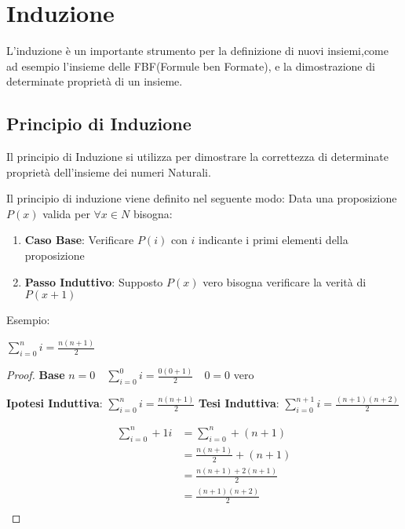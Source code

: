 \chapter{Induzione}
L'induzione è un importante strumento per la definizione di nuovi insiemi,come
ad esempio l'insieme delle FBF(Formule ben Formate), e la dimostrazione di determinate
proprietà di un insieme.

\section{Principio di Induzione}
Il principio di Induzione si utilizza per dimostrare la correttezza di determinate
proprietà dell'insieme dei numeri Naturali.

Il principio di induzione viene definito nel seguente modo:\newline
Data una proposizione $P(x)$ valida per $\forall x \in N$ bisogna:
\begin{enumerate}
  \item \textbf{Caso Base}: Verificare $P(i)$ con $i$ indicante i primi elementi della proposizione
  \item \textbf{Passo Induttivo}: Supposto $P(x)$ vero  bisogna verificare la verità di $P(x+1)$
\end{enumerate}

Esempio:\newline
\begin{thm}$\displaystyle \sum_{i = 0} ^ n i = \frac{n(n + 1)}{2}$ \end{thm}

\begin{proof}
\textbf{Base} $n = 0 \quad \displaystyle \sum_{i = 0} ^ 0 i = \frac{0(0 + 1)}{2} \quad 0 = 0$ vero

\textbf{Ipotesi Induttiva}: $\displaystyle \sum_{i = 0} ^ n i = \frac{n(n+1)}{2}$ \newline
\textbf{Tesi Induttiva}: $\displaystyle \sum_{i = 0} ^ {n+1} i = \frac{(n+1)(n+2)}{2}$

\begin{equation*}
\begin{split}
  \sum_{i = 0}^n+1 i & = \sum_{i = 0} ^ n + (n+1) \\
                     & = \frac{n(n+1)}{2} + (n+1) \\
                     & = \frac{n(n+1) + 2(n+1)}{2} \\
                     & = \frac{(n+1)(n+2)}{2} \\
\end{split}
\end{equation*}
\end{proof}

